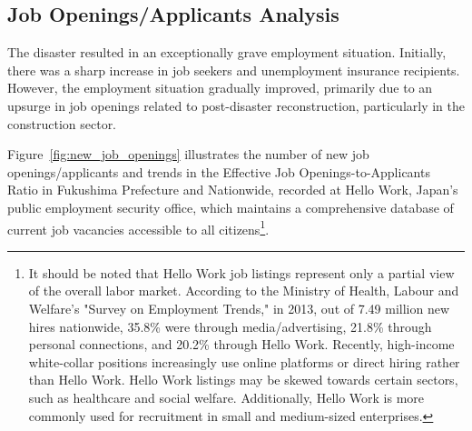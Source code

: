 \documentclass[a4paper,12pt]{article}
\begin{document}

\subsection{Job Openings/Applicants Analysis}
\label{sec4.1}

The disaster resulted in an exceptionally grave employment situation. Initially, there was a sharp increase in job seekers and unemployment insurance recipients. However, the employment situation gradually improved, primarily due to an upsurge in job openings related to post-disaster reconstruction, particularly in the construction sector. 


Figure~\ref{fig:new_job_openings} illustrates the number of new job openings/applicants and trends in the Effective Job Openings-to-Applicants Ratio in Fukushima Prefecture and Nationwide, recorded at Hello Work, Japan’s public employment security office, which maintains a comprehensive database of current job vacancies accessible to all citizens\footnote{It should be noted that Hello Work job listings represent only a partial view of the overall labor market. According to the Ministry of Health, Labour and Welfare's "Survey on Employment Trends," in 2013, out of 7.49 million new hires nationwide, 35.8\% were through media/advertising, 21.8\% through personal connections, and 20.2\% through Hello Work. Recently, high-income white-collar positions increasingly use online platforms or direct hiring rather than Hello Work. Hello Work listings may be skewed towards certain sectors, such as healthcare and social welfare. Additionally, Hello Work is more commonly used for recruitment in small and medium-sized enterprises.}. 


\end{document}
